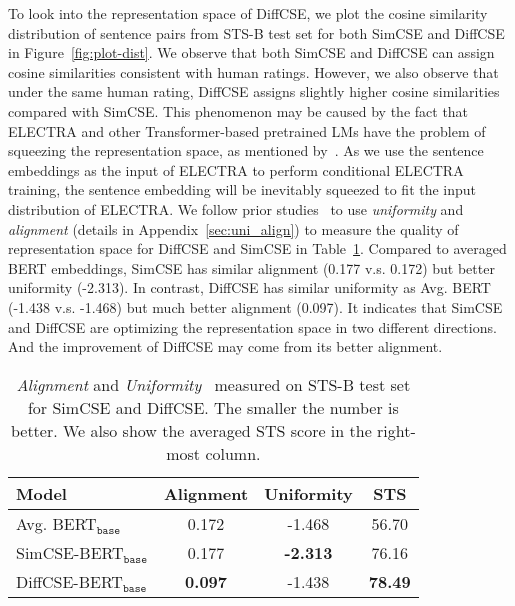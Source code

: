 \documentclass[11pt]{article}
\newcommand{\ba}{$_\texttt{base}$\xspace}
\begin{document}
To look into the representation space of DiffCSE, we plot the cosine similarity distribution of sentence pairs from STS-B test set for both SimCSE and DiffCSE in Figure~\ref{fig:plot-dist}. We observe that both SimCSE and DiffCSE can assign cosine similarities consistent with human ratings. However, we also observe that under the same human rating, DiffCSE assigns slightly higher cosine similarities compared with SimCSE. This phenomenon may be caused by the fact that ELECTRA and other Transformer-based pretrained LMs have the problem of squeezing the representation space, as mentioned by~\citet{meng2021coco}. As we use the sentence embeddings as the input of ELECTRA to perform conditional ELECTRA training, the sentence embedding will be inevitably squeezed to fit the input distribution of ELECTRA. We follow prior studies~\cite{wang2020understanding, gao2021simcse} to use \emph{uniformity} and \emph{alignment} (details in Appendix~\ref{sec:uni_align}) to measure the quality of representation space for DiffCSE and SimCSE in Table~\ref{tab:uni_align}. Compared to averaged BERT embeddings, SimCSE has similar alignment (0.177 v.s. 0.172) but better uniformity (-2.313). In contrast, DiffCSE has similar uniformity as Avg. BERT (-1.438 v.s. -1.468) but much better alignment (0.097). It indicates that SimCSE and DiffCSE are optimizing the representation space in two different directions. And the improvement of DiffCSE may come from its better alignment.

\begin{table}[t]
    \begin{center}
    \centering
    \small
    \begin{tabular}{l|cc|c}
    \toprule
       \bf Model & \bf Alignment & \bf Uniformity & \bf STS \\
    \midrule
        Avg. BERT\ba & 0.172 & -1.468 & 56.70 \\
        SimCSE-BERT\ba & 0.177 & \bf -2.313 & 76.16 \\
        DiffCSE-BERT\ba & \bf 0.097 & -1.438 & \bf 78.49 \\
    \bottomrule
    \end{tabular}
    \end{center}
    \vspace{-2mm}
    \caption{
        \emph{Alignment} and \emph{Uniformity}~\cite{wang2020understanding} measured on STS-B test set for SimCSE and DiffCSE. The smaller the number is better. We also show the averaged STS score in the right-most column.
    }
    \label{tab:uni_align}
    \vspace{-3mm}
\end{table}
\end{document}
